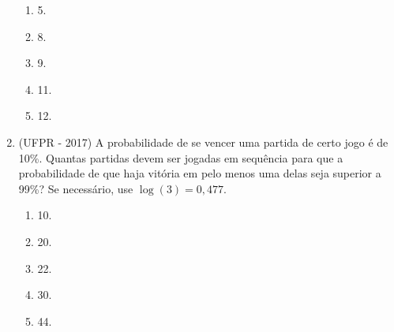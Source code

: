 \begin{enumerate}
\begin{enumerate}
\item 5. 
\item 8. 
\item 9.
\item 11.
\item 12.
\end{enumerate}


%

\item \label{Exer15} (UFPR - 2017) A probabilidade de se vencer uma partida de certo jogo é de 10{\%}. Quantas partidas devem ser 
jogadas em sequência para que a probabilidade de que haja vitória em pelo menos uma delas seja superior a 99{\%}? Se 
necessário, use $\log(3) = 0{,}477$.
\begin{enumerate}
\item 10.
\item 20.
\item 22.
\item 30.
\item 44.

\end{enumerate}

\end{enumerate}

